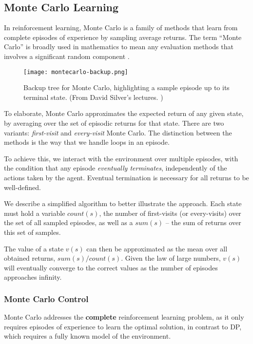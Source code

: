 \clearpage

\subsection{Monte Carlo Learning} \label{rl:mc}
In reinforcement learning, Monte Carlo is a family of methods that learn from complete episodes of experience by sampling average returns.
The term “Monte Carlo” is broadly used in mathematics to mean any evaluation methods that involves a significant random component \cite{rlai}.

\begin{figure}[ht]
    \caption{Backup tree for Monte Carlo, highlighting a sample episode up to its terminal state. (From David Silver's lectures. \cite{silver-lectures})}
    \centering
    \texttt{[image: montecarlo-backup.png]}
\end{figure}

To elaborate, Monte Carlo approximates the expected return of any given state, by averaging over the set of episodic returns for that state.
There are two variants: \emph{first-visit} and \emph{every-visit} Monte Carlo.
The distinction between the methods is the way that we handle loops in an episode.

To achieve this, we interact with the environment over multiple episodes, with the condition that any episode \emph{eventually terminates}, independently of the actions taken by the agent.
Eventual termination is necessary for all returns to be well-defined.

We describe a simplified algorithm to better illustrate the approach.
Each state must hold a variable $count(s)$, the number of first-visits (or every-visits) over the set of all sampled episodes, as well as a $sum(s)$ -- the sum of returns over this set of samples.

The value of a state $v(s)$ can then be approximated as the mean over all obtained returns, $sum(s) / count(s)$.
Given the law of large numbers, $v(s)$ will eventually converge to the correct values as the number of episodes approaches infinity.

\subsubsection{Monte Carlo Control}
Monte Carlo addresses the \textbf{complete} reinforcement learning problem, as it only requires episodes of experience to learn the optimal solution, in contrast to DP, which requires a fully known model of the environment.

